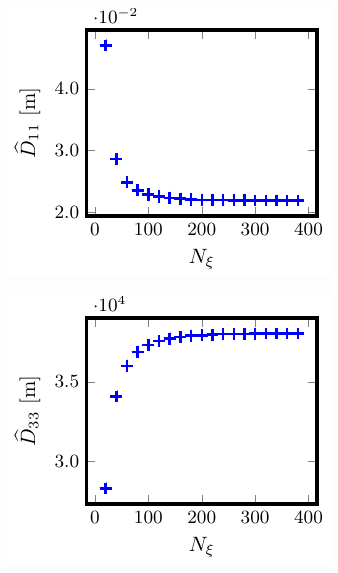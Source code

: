 \documentclass[10pt]{iopart}
\begin{document}
\begin{figure}[h]
	\centering
	\begin{subfigure}[t]{0.32\textwidth}
		\includegraphics{Convergence-Legendre-W7X-EIM-s0200-Er-0-D11.pdf}
		\caption{}
		\label{subfig:D11_Convergence_W7X_EIM_Er_0_Legendre}
	\end{subfigure}
	\begin{subfigure}[t]{0.32\textwidth}
		\includegraphics{Convergence-Legendre-W7X-EIM-s0200-Er-0-D33}
		\caption{}
		\label{subfig:D33_Convergence_W7X_EIM_Er_0_Legendre}
	\end{subfigure}
	

\end{figure}
\end{document}
